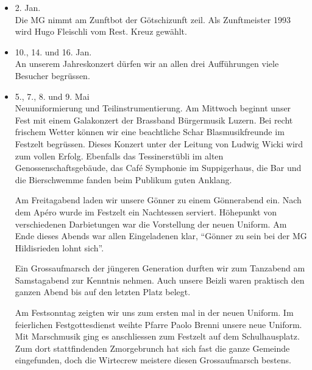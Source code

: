\begin{history}


    \begin{itemize}

        \item[]2. Jan.\\
        Die MG nimmt am Zunftbot der Götschizunft zeil. Als Zunftmeister 1993
        wird Hugo Fleischli vom Rest. Kreuz gewählt.

        \item[]10., 14. und 16. Jan.\\
        An unserem Jahreskonzert dürfen wir an allen drei Aufführungen viele
        Besucher begrüssen.

        \item[]5., 7., 8. und 9. Mai\\
        Neuuniformierung und Teilinstrumentierung. Am Mittwoch beginnt unser
        Fest mit einem Galakonzert der Brassband Bürgermusik Luzern. Bei recht
        frischem Wetter können wir eine beachtliche Schar Blasmusikfreunde im
        Festzelt begrüssen. Dieses Konzert unter der Leitung von Ludwig Wicki
        wird zum vollen Erfolg. Ebenfalls das Tessinerstübli im alten
        Genossenschaftsgebäude, das Café Symphonie im Suppigerhaus, die Bar und
        die Bierschwemme fanden beim Publikum guten Anklang.

        Am Freitagabend laden wir unsere Gönner zu einem Gönnerabend ein. Nach
        dem Apéro wurde im Festzelt ein Nachtessen serviert. Höhepunkt von
        verschiedenen Darbietungen war die Vorstellung der neuen Uniform. Am
        Ende dieses Abends war allen Eingeladenen klar, \enquote{Gönner zu sein
            bei der MG Hildisrieden lohnt sich}.

        Ein Grossaufmarsch der jüngeren Generation durften wir zum Tanzabend am
        Samstagabend zur Kenntnis nehmen. Auch unsere Beizli waren praktisch den
        ganzen Abend bis auf den letzten Platz belegt.

        Am Festsonntag zeigten wir uns zum ersten mal in der neuen Uniform. Im
        feierlichen Festgottesdienst weihte Pfarre Paolo Brenni unsere neue
        Uniform. Mit Marschmusik ging es anschliessen zum Festzelt auf dem
        Schulhausplatz. Zum dort stattfindenden Zmorgebrunch hat sich fast die
        ganze Gemeinde eingefunden, doch die Wirtecrew meistere diesen
        Grossaufmarsch bestens.


\end{itemize}
\end{history}
